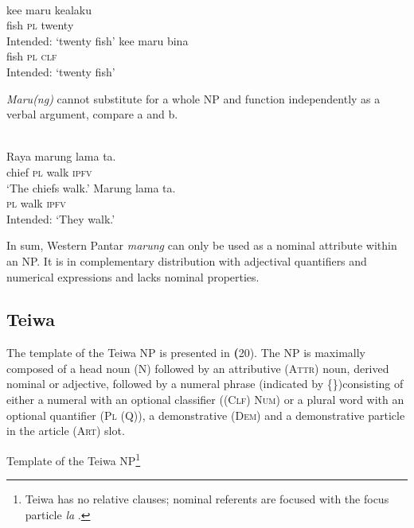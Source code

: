 \ea%
\label{ex:9:18}
 \\
\ea
\gll *ke{\textglotstop}e  maru kealaku \\
   fish  \textsc{pl} twenty \\
\glt Intended: `twenty fish'
\ex 
\gll *ke{\textglotstop}e maru  bina \\
 fish \textsc{pl} \textsc{clf} \\
 \glt Intended: `twenty fish'
\z
\z

\textit{Maru(ng)} cannot substitute for a whole NP and function independently as a verbal argument, compare a and b.


\ea%
\label{ex:9:19}
 \\
\ea
\gll  Raya marung lama ta. \\
   chief \textsc{pl} walk \textsc{ipfv}  \\
\glt `The chiefs walk.'
\ex
\gll *Marung lama ta. \\
  \textsc{pl} walk \textsc{ipfv}  \\
\glt Intended: `They walk.'
\z
\z


 In sum, Western Pantar \textit{marung} can only be used as a nominal attribute within an NP. It is in complementary distribution with adjectival quantifiers and numerical expressions and lacks nominal properties.

\subsection{Teiwa} %
\label{sec:9:3.2}
The template of the Teiwa NP is presented in \textbf{(}20). The NP is maximally composed of a head noun (N) followed by an attributive (\textsc{Attr)} noun, derived nominal or adjective\textsc{,} followed by a numeral phrase (indicated by \{\})consisting of either a numeral with an optional classifier (\textsc{(Clf)} \textsc{Num)} or a plural word with an optional quantifier (\textsc{Pl} \textsc{(Q)),} a demonstrative \textsc{(Dem)} and a demonstrative particle in the article (\textsc{Art)} slot.

\ea%
\label{ex:9:20}

 Template of the Teiwa NP\footnote{Teiwa has no relative clauses; nominal referents are focused with the focus particle \textit{la} \citep{Klamer2010grammar}.}

